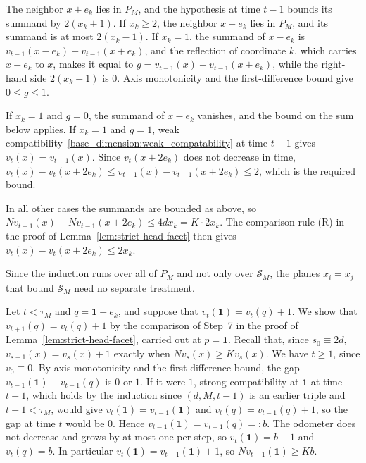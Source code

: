 \documentclass[12pt]{amsart}
\begin{document}
The neighbor $x+e_k$ lies in $P_M$, and the hypothesis at time $t-1$ bounds its summand by $2(x_k+1)$. If $x_k\geq2$, the neighbor $x-e_k$ lies in $P_M$, and its summand is at most $2(x_k-1)$. If $x_k=1$, the summand of $x-e_k$ is $v_{t-1}(x-e_k)-v_{t-1}(x+e_k)$, and the reflection of coordinate $k$, which carries $x-e_k$ to $x$, makes it equal to $g=v_{t-1}(x)-v_{t-1}(x+e_k)$, while the right-hand side $2(x_k-1)$ is $0$. Axis monotonicity and the first-difference bound give $0\leq g\leq 1$.

If $x_k=1$ and $g=0$, the summand of $x-e_k$ vanishes, and the bound on the sum below applies. If $x_k=1$ and $g=1$, weak compatibility~\eqref{base_dimension:weak_compatability} at time $t-1$ gives $v_t(x)=v_{t-1}(x)$. Since $v_t(x+2e_k)$ does not decrease in time, $v_t(x)-v_t(x+2e_k)\leq v_{t-1}(x)-v_{t-1}(x+2e_k)\leq 2$, which is the required bound.

In all other cases the summands are bounded as above, so $Nv_{t-1}(x)-Nv_{t-1}(x+2e_k)\leq 4dx_k=K\cdot 2x_k$. The comparison rule (R) in the proof of Lemma~\ref{lem:strict-head-facet} then gives $v_t(x)-v_t(x+2e_k)\leq 2x_k$.

Since the induction runs over all of $P_M$ and not only over $\mathcal{S}_M$, the planes $x_i=x_j$ that bound $\mathcal{S}_M$ need no separate treatment.

Let $t<\tau_M$ and $q=\mathbf{1}+e_k$, and suppose that $v_t(\mathbf{1})=v_t(q)+1$. We show that $v_{t+1}(q)=v_t(q)+1$ by the comparison of Step~7 in the proof of Lemma~\ref{lem:strict-head-facet}, carried out at $p=\mathbf{1}$. Recall that, since $s_0\equiv2d$, $v_{s+1}(x)=v_s(x)+1$ exactly when $Nv_s(x)\geq Kv_s(x)$. We have $t\geq1$, since $v_0\equiv0$. By axis monotonicity and the first-difference bound, the gap $v_{t-1}(\mathbf{1})-v_{t-1}(q)$ is $0$ or $1$. If it were $1$, strong compatibility at $\mathbf{1}$ at time $t-1$, which holds by the induction since $(d,M,t-1)$ is an earlier triple and $t-1<\tau_M$, would give $v_t(\mathbf{1})=v_{t-1}(\mathbf{1})$ and $v_t(q)=v_{t-1}(q)+1$, so the gap at time $t$ would be $0$. Hence $v_{t-1}(\mathbf{1})=v_{t-1}(q)=:b$. The odometer does not decrease and grows by at most one per step, so $v_t(\mathbf{1})=b+1$ and $v_t(q)=b$. In particular $v_t(\mathbf{1})=v_{t-1}(\mathbf{1})+1$, so $Nv_{t-1}(\mathbf{1})\geq Kb$.
\end{document}
